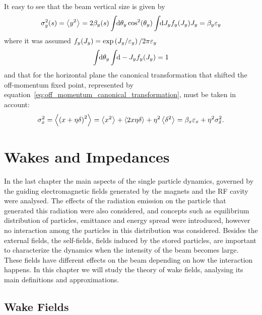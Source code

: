     It easy to see that the beam vertical size is given by
    \begin{align}
        \sigma_y^2(s) = \left\langle y^2 \right\rangle_{{}} = 2\beta_y(s)\int\!\!\text{d}\theta_y \cos^2(\theta_y)\int\!\!\text{d}J_y f_y(J_y)J_y = \beta_y\varepsilon_y
    \end{align}
    where it was assumed $f_y(J_y) = \exp\left(J_y/\varepsilon_y\right)/2\pi\varepsilon_y$
    \begin{align}
        \int\!\!\text{d}\theta_y \int\!\!\text{d}-J_y f_y(J_y) = 1
    \end{align}
    and that for the horizontal plane the canonical transformation that shifted the off-momentum fixed point, represented by equation~\eqref{eq:off_momentum_canonical_transformation}, must be taken in account:
    \begin{align}
        \sigma_x^2 = \left\langle \left(x+\eta\delta\right)^2 \right\rangle_{{}} = \left\langle x^2 \right\rangle_{{}} + \left\langle 2x\eta\delta \right\rangle_{{}} + \eta^2\left\langle \delta^2 \right\rangle_{{}} = \beta_x\varepsilon_x + \eta^2\sigma_\delta^2.
    \end{align}


\chapter{Wakes and Impedances}\label{cap:wakes_impedances}

    In the last chapter the main aspects of the single particle dynamics, governed by the guiding electromagnetic fields generated by the magnets and the RF cavity were analysed. The effects of the radiation emission on the particle that generated this radiation were also considered, and concepts such as equilibrium distribution of particles, emittance and energy spread were introduced, however no interaction among the particles in this distribution was considered. Besides the external fields, the self-fields, fields induced by the stored particles, are important to characterize the dynamics when the intensity of the beam becomes large. These fields have different effects on the beam depending on how the interaction happens. In this chapter we will study the theory of wake fields, analysing its main definitions and approximations.

\section{Wake Fields}\label{sec:wake_fields}

